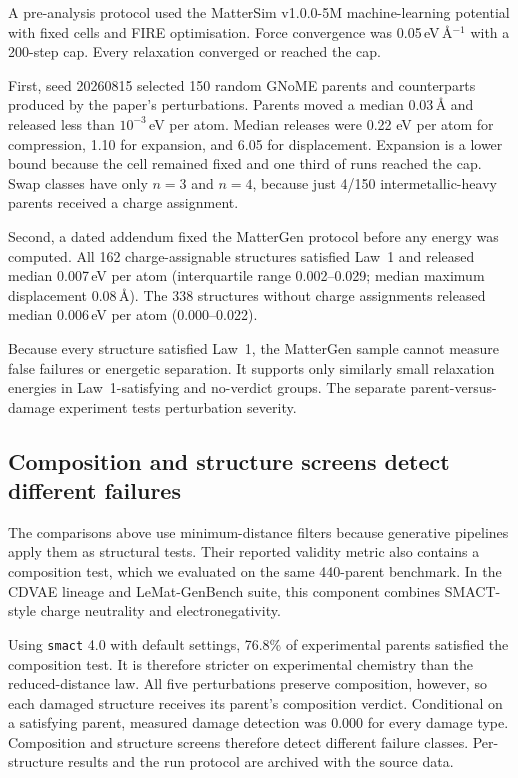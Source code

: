A pre-analysis protocol used the MatterSim v1.0.0-5M machine-learning potential
with fixed cells and FIRE optimisation. Force convergence was
0.05\,eV\,\AA$^{-1}$ with a 200-step cap. Every relaxation converged or reached
the cap.

First, seed 20260815 selected 150 random GNoME parents and counterparts produced
by the paper's perturbations. Parents moved a median 0.03\,\AA{} and released less
than $10^{-3}$\,eV per atom. Median releases were 0.22 eV per atom for compression,
1.10 for expansion, and 6.05 for displacement. Expansion is a lower bound because
the cell remained fixed and one third of runs reached the cap. Swap classes have
only $n=3$ and $n=4$, because just 4/150 intermetallic-heavy parents received a
charge assignment.

Second, a dated addendum fixed the MatterGen protocol before any energy was
computed. All 162 charge-assignable structures satisfied Law~1 and released
median 0.007\,eV per atom (interquartile range 0.002--0.029; median maximum
displacement 0.08\,\AA{}). The 338 structures without charge assignments released
median 0.006\,eV per atom (0.000--0.022).

Because every structure satisfied Law~1, the MatterGen sample cannot measure
false failures or energetic separation. It supports only similarly small
relaxation energies in Law~1-satisfying and no-verdict groups. The separate
parent-versus-damage experiment tests perturbation severity.

\subsection{Composition and structure screens detect different failures}
\label{s17.x-incumbents-scored}

The comparisons above use minimum-distance filters because generative pipelines
apply them as structural tests. Their reported validity metric also contains a
composition test, which we evaluated on the same 440-parent benchmark. In the
CDVAE lineage and LeMat-GenBench suite, this component combines SMACT-style
charge neutrality and electronegativity.

Using \texttt{smact} 4.0 with default settings, 76.8\% of experimental parents
satisfied the composition test. It is therefore stricter on experimental
chemistry than the reduced-distance law. All five perturbations preserve
composition, however, so each damaged structure receives its parent's
composition verdict. Conditional on a satisfying parent, measured damage
detection was 0.000 for every damage type. Composition and structure screens
therefore detect different failure classes. Per-structure results and the run
protocol are archived with the source data.

